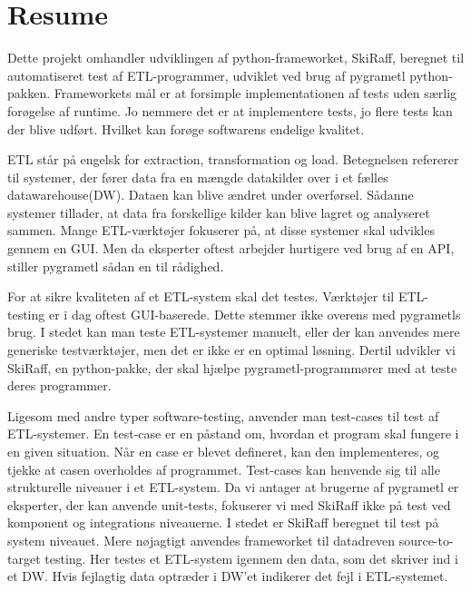 \section*{Resume}
\setcounter{page}{0}
Dette projekt omhandler udviklingen af python-frameworket, SkiRaff, beregnet til automatiseret test af ETL-programmer, udviklet ved brug af pygrametl python-pakken. Frameworkets mål er at forsimple implementationen af tests uden særlig forøgelse af runtime. Jo nemmere det er at implementere tests, jo flere tests kan der blive udført. Hvilket kan forøge softwarens endelige kvalitet.  

ETL står på engelsk for extraction, transformation og load. Betegnelsen refererer til systemer, der fører data fra en mængde datakilder over i et fælles datawarehouse(DW). Dataen kan blive ændret  under overførsel. Sådanne systemer tillader, at data fra forskellige kilder kan blive lagret og analyseret sammen. Mange ETL-værktøjer fokuserer på, at disse systemer skal udvikles gennem en GUI. Men da eksperter oftest arbejder hurtigere ved brug af en API, stiller pygrametl sådan en til rådighed.   

For at sikre kvaliteten af et ETL-system skal det testes. Værktøjer til ETL-testing er i dag oftest GUI-baserede. Dette stemmer ikke overens med pygrametls brug. I stedet kan man teste ETL-systemer manuelt, eller der kan anvendes mere generiske testværktøjer, men det er ikke er en optimal løsning. Dertil udvikler vi SkiRaff, en python-pakke, der skal hjælpe pygrametl-programmører med at teste deres programmer.

Ligesom med andre typer software-testing, anvender man test-cases til test af  ETL-systemer. En test-case er en påstand om, hvordan et program skal fungere i en given situation. Når en case er blevet defineret, kan den implementeres, og tjekke at casen overholdes af programmet. Test-cases kan henvende sig til alle strukturelle niveauer i et ETL-system. Da vi antager at brugerne af pygrametl er eksperter, der kan anvende unit-tests, fokuserer vi med SkiRaff ikke på test ved komponent og integrations niveauerne. I stedet er SkiRaff beregnet til test på system niveauet. Mere nøjagtigt anvendes frameworket til datadreven source-to-target testing. Her testes et ETL-system igennem den data, som det skriver ind i et DW. Hvis fejlagtig data optræder i DW’et indikerer det fejl i ETL-systemet. 

